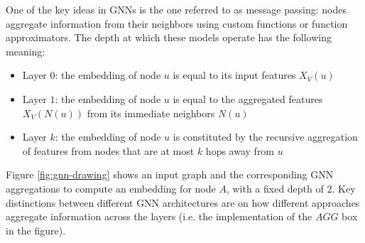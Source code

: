 \documentclass[a4paper,10pt]{report}
\begin{document}
One of the key ideas in GNNs is the one referred to as message passing: nodes aggregate information from their neighbors using custom functions or function approximators. The depth at which these models operate has the following meaning:
\begin{itemize}
	\item Layer $0$: the embedding of node $u$ is equal to its input features $X_V(u)$
	\item Layer $1$: the embedding of node $u$ is equal to the aggregated features $X_V(N(u))$ from its immediate neighbors $N(u)$
	\item Layer $k$: the embedding of node $u$ is constituted by the recursive aggregation of features from nodes that are at most $k$ hops away from $u$  
\end{itemize}

Figure \ref{fig:gnn-drawing} shows an input graph and the corresponding GNN aggregations to compute an embedding for node $A$, with a fixed depth of $2$. Key distinctions between different GNN architectures are on how different approaches aggregate information across the layers (i.e. the implementation of the $AGG$ box in the figure).
\end{document}
